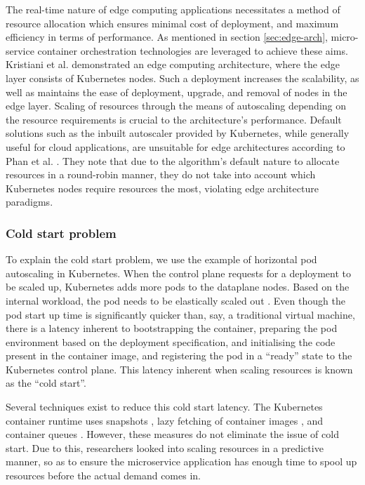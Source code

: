 The real-time nature of edge computing applications necessitates a method of resource allocation which ensures minimal cost of deployment, and maximum efficiency in terms of performance. As mentioned in section \ref{sec:edge-arch}, micro-service container orchestration technologies are leveraged to achieve these aims. Kristiani et al. \cite{kristiani2019} demonstrated an edge computing architecture, where the edge layer consists of Kubernetes nodes. Such a deployment increases the scalability, as well as maintains the ease of deployment, upgrade, and removal of nodes in the edge layer. Scaling of resources through the means of autoscaling depending on the resource requirements is crucial to the architecture's performance. Default solutions such as the inbuilt autoscaler provided by Kubernetes, while generally useful for cloud applications, are unsuitable for edge architectures according to Phan et al. \cite{phan2022traffic}. They note that due to the algorithm's default nature to allocate resources in a round-robin manner, they do not take into account which Kubernetes nodes require resources the most, violating edge architecture paradigms.

\subsubsection{Cold start problem}
\label{subsubsec:cold-start}

To explain the cold start problem, we use the example of horizontal pod autoscaling in Kubernetes. When the control plane requests for a deployment to be scaled up, Kubernetes adds more pods to the dataplane nodes.  Based on the internal workload, the pod needs to be elastically scaled out \cite{beni2021reducing}. Even though the pod start up time is significantly quicker than, say, a traditional virtual machine, there is a latency inherent to bootstrapping the container, preparing the pod environment based on the deployment specification, and initialising the code present in the container image, and registering the pod in a ``ready'' state to the Kubernetes control plane. This latency inherent when scaling resources is known as the ``cold start''.\par

Several techniques exist to reduce this cold start latency. The Kubernetes container runtime uses snapshots \cite{cadden2019seuss}, lazy fetching of container images \cite{lorenzo2019fogdocker}, and container queues \cite{lin2019mitigating}. However, these measures do not eliminate the issue of cold start. Due to this, researchers looked into scaling resources in a predictive manner, so as to ensure the microservice application has enough time to spool up resources before the actual demand comes in.\par

